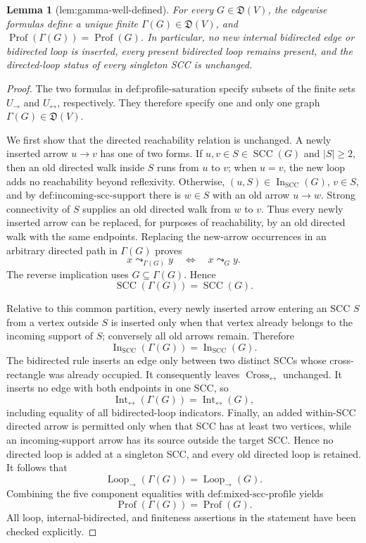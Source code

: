 \documentclass{article}
\newtheorem{lemma}{Lemma}
\begin{document}
\begin{lemma}[lem:gamma-well-defined]\label{lem:gamma-well-defined}
For every \(G\in\mathfrak D(V)\), the edgewise formulas define a unique finite \(\Gamma(G)\in\mathfrak D(V)\), and \(\operatorname{Prof}(\Gamma(G))=\operatorname{Prof}(G)\). In particular, no new internal bidirected edge or bidirected loop is inserted, every present bidirected loop remains present, and the directed-loop status of every singleton SCC is unchanged.
\end{lemma}
\begin{proof}
The two formulas in \(\text{def:profile-saturation}\) specify subsets of the finite sets \(U_{\to}\) and \(U_{\leftrightarrow}\), respectively.  They therefore specify one and only one graph \(\Gamma(G)\in\mathfrak D(V)\).

We first show that the directed reachability relation is unchanged.  A newly inserted arrow \(u\to v\) has one of two forms.  If \(u,v\in S\in\operatorname{SCC}(G)\) and \(|S|\ge2\), then an old directed walk inside \(S\) runs from \(u\) to \(v\); when \(u=v\), the new loop adds no reachability beyond reflexivity.  Otherwise, \((u,S)\in\operatorname{In}_{\mathrm{SCC}}(G)\), \(v\in S\), and by \(\text{def:incoming-scc-support}\) there is \(w\in S\) with an old arrow \(u\to w\).  Strong connectivity of \(S\) supplies an old directed walk from \(w\) to \(v\).  Thus every newly inserted arrow can be replaced, for purposes of reachability, by an old directed walk with the same endpoints.  Replacing the new-arrow occurrences in an arbitrary directed path in \(\Gamma(G)\) proves
\[
x\leadsto_{\Gamma(G)}y\quad\Longleftrightarrow\quad x\leadsto_G y.
\]
The reverse implication uses \(G\subseteq\Gamma(G)\).  Hence
\[
\operatorname{SCC}(\Gamma(G))=\operatorname{SCC}(G).
\]

Relative to this common partition, every newly inserted arrow entering an SCC \(S\) from a vertex outside \(S\) is inserted only when that vertex already belongs to the incoming support of \(S\); conversely all old arrows remain.  Therefore
\[
\operatorname{In}_{\mathrm{SCC}}(\Gamma(G))
=\operatorname{In}_{\mathrm{SCC}}(G).
\]
The bidirected rule inserts an edge only between two distinct SCCs whose cross-rectangle was already occupied.  It consequently leaves \(\operatorname{Cross}_{\leftrightarrow}\) unchanged.  It inserts no edge with both endpoints in one SCC, so
\[
\operatorname{Int}_{\leftrightarrow}(\Gamma(G))
=\operatorname{Int}_{\leftrightarrow}(G),
\]
including equality of all bidirected-loop indicators.  Finally, an added within-SCC directed arrow is permitted only when that SCC has at least two vertices, while an incoming-support arrow has its source outside the target SCC.  Hence no directed loop is added at a singleton SCC, and every old directed loop is retained.  It follows that
\[
\operatorname{Loop}_{\to}(\Gamma(G))
=\operatorname{Loop}_{\to}(G).
\]
Combining the five component equalities with \(\text{def:mixed-scc-profile}\) yields
\[
\operatorname{Prof}(\Gamma(G))=\operatorname{Prof}(G).
\]
All loop, internal-bidirected, and finiteness assertions in the statement have been checked explicitly.
\end{proof}
\end{document}
